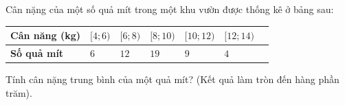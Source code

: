 \begin{bt}%

Cân nặng của một số quả mít trong một khu vườn được thống kê ở bảng sau:
\begin{center}
\begin{tabular}{|>{\centering\arraybackslash}m{4cm}|>{\centering\arraybackslash}m{2cm}|>{\centering\arraybackslash}m{2cm}|>{\centering\arraybackslash}m{2cm}|>{\centering\arraybackslash}m{2cm}|>{\centering\arraybackslash}m{2cm}|>{\centering\arraybackslash}m{2cm}|}
\hline
\textbf{Cân năng (kg)} & $[4;6)$ & $[6;8)$ & $[8;10)$ & $[10;12)$& $[12;14)$\\
\hline
\textbf{Số quả mít} & $6$ & $12$ & $19$ & $9$ & $4$\\
\hline
\end{tabular}
\end{center}
Tính cân nặng trung bình của một quả mít? (Kết quả làm tròn đến hàng phần trăm).
\end{bt}

